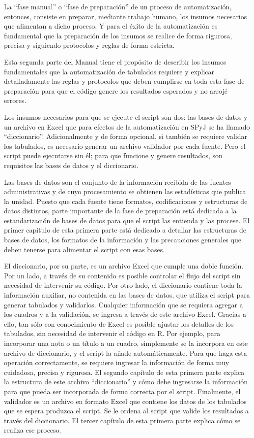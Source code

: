 \documentclass[
  spanish,
]{book}
\begin{document}
La ``fase manual'' o ``fase de preparación'' de un proceso de automatización, entonces, consiste en preparar, mediante trabajo humano, los insumos necesarios que alimentan a dicho proceso. Y para el éxito de la automatización es fundamental que la preparación de los insumos se realice de forma rigurosa, precisa y siguiendo protocolos y reglas de forma estricta.

Esta segunda parte del Manual tiene el propósito de describir los insumos fundamentales que la automatización de tabulados requiere y explicar detalladamente las reglas y protocolos que deben cumplirse en toda esta fase de preparación para que el código genere los resultados esperados y no arrojé errores.

Los insumos necesarios para que se ejecute el script son dos: las bases de datos y un archivo en Excel que para efectos de la automatización en SPyJ se ha llamado ``diccionario''. Adicionalmente y de forma opcional, si también se requiere validar los tabulados, es necesario generar un archivo validador por cada fuente. Pero el script puede ejecutarse sin él; para que funcione y genere resultados, son requisitos las bases de datos y el diccionario.

Las bases de datos son el conjunto de la información recibida de las fuentes administrativas y de cuyo procesamiento se obtienen las estadísticas que publica la unidad. Puesto que cada fuente tiene formatos, codificaciones y estructuras de datos distintos, parte importante de la fase de preparación está dedicada a la estandarización de bases de datos para que el script las entienda y las procese. El primer capítulo de esta primera parte está dedicado a detallar las estructuras de bases de datos, los formatos de la información y las precauciones generales que deben tenerse para alimentar el script con esas bases.

El diccionario, por su parte, es un archivo Excel que cumple una doble función. Por un lado, a través de su contenido es posible controlar el flujo del script sin necesidad de intervenir su código. Por otro lado, el diccionario contiene toda la información auxiliar, no contenida en las bases de datos, que utiliza el script para generar tabulados y validarlos. Cualquier información que se requiera agregar a los cuadros y a la validación, se ingresa a través de este archivo Excel. Gracias a ello, tan sólo con conocimiento de Excel es posible ajustar los detalles de los tabulados, sin necesidad de intervenir el código en R. Por ejemplo, para incorporar una nota o un título a un cuadro, simplemente se la incorpora en este archivo de diccionario, y el script la añade automáticamente. Para que haga esta operación correctamente, se requiere ingresar la información de forma muy cuidadosa, precisa y rigurosa. El segundo capítulo de esta primera parte explica la estructura de este archivo ``diccionario'' y cómo debe ingresarse la información para que pueda ser incorporada de forma correcta por el script.
Finalmente, el validador es un archivo en formato Excel que contiene los datos de los tabulados que se espera produzca el script. Se le ordena al script que valide los resultados a través del diccionario. El tercer capítulo de esta primera parte explica cómo se realiza ese proceso.
\end{document}
